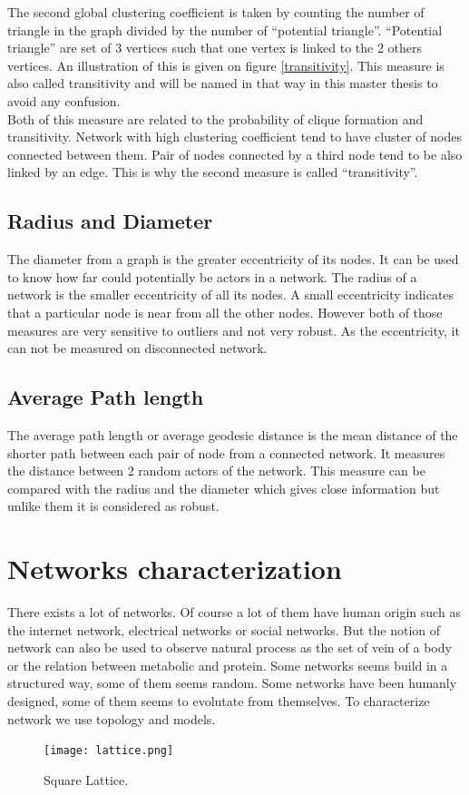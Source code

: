 \documentclass[a4paper, 12pt]{report}
\begin{document}
The second global clustering coefficient is taken by counting the number of triangle in the graph divided by the number of ``potential triangle''. ``Potential triangle'' are set of 3 vertices such that one vertex is linked to the 2 others vertices. An illustration of this is given on figure \ref{transitivity}. This measure is also called  transitivity and will be named in that way in this master thesis to avoid any confusion. \\

Both of this measure are related to the probability of clique formation and transitivity. Network with high clustering coefficient tend to have cluster of nodes connected between them. Pair of nodes connected by a third node tend to be also linked by an edge. This is why the second measure is called ``transitivity''.\\

\subsection{Radius and Diameter}
The diameter from a graph is the greater eccentricity of its nodes. It can be used to know how far could potentially be actors in a network. The radius of a network is the smaller eccentricity of all its nodes. A small eccentricity indicates that a particular node is  near from all the other nodes. However both of those measures are very sensitive to outliers and not very robust. As the eccentricity, it can not be measured on disconnected network.

\subsection{Average Path length}
The average path length \citep{path_length} or average geodesic distance is the mean distance of the shorter path between each pair of node from a connected network. It measures the distance between 2 random actors of the network. This measure can be compared with the radius and the diameter which gives close information but unlike them it is considered as robust.
 
\section{Networks characterization}
There exists a lot of networks. Of course a lot of them have human origin such as the internet network, electrical networks or social networks. But the notion of network can also be used to observe natural process as the set of vein of a body or the relation between metabolic and protein. Some networks seems build in a structured way, some of them seems random. Some networks have been humanly designed, some of them seems to evolutate from themselves. To characterize network we use topology and models.\\
\begin{figure}
\centering
\texttt{[image: lattice.png]}
\caption{Square Lattice. \citep{complex_networks} }
\label{lattice}
\end{figure}
\end{document}
